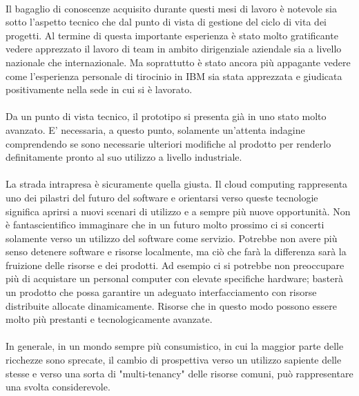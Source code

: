 \paragraph{}
Il bagaglio di conoscenze acquisito durante questi mesi di lavoro è notevole sia sotto l'aspetto tecnico che dal punto di vista di gestione del ciclo di vita dei progetti. Al termine di questa importante esperienza è stato molto gratificante vedere apprezzato il lavoro di team in ambito dirigenziale aziendale sia a livello nazionale che internazionale. Ma soprattutto è stato ancora più appagante vedere come l'esperienza personale di tirocinio in IBM sia stata apprezzata e giudicata positivamente nella sede in cui si è lavorato.

\paragraph{}
Da un punto di vista tecnico, il prototipo si presenta già in uno stato molto avanzato. E' necessaria, a questo punto, solamente un'attenta indagine comprendendo se sono necessarie ulteriori modifiche al prodotto per renderlo definitamente pronto al suo utilizzo a livello industriale.
\paragraph{}
La strada intrapresa è sicuramente quella giusta. Il cloud computing rappresenta uno dei pilastri del futuro del software e orientarsi verso queste tecnologie significa aprirsi a nuovi scenari di utilizzo e a sempre più nuove opportunità. Non è fantascientifico immaginare che in un futuro molto prossimo ci si concerti solamente verso un utilizzo del software come servizio. Potrebbe non avere più senso detenere software e risorse localmente, ma ciò che farà la differenza sarà la fruizione delle risorse e dei prodotti. Ad esempio ci si potrebbe non preoccupare più di acquistare un personal computer con elevate specifiche hardware; basterà un prodotto che possa garantire un adeguato interfacciamento con risorse distribuite allocate dinamicamente. Risorse che in questo modo possono essere molto più prestanti e tecnologicamente avanzate.
\paragraph{}
In generale, in un mondo sempre più consumistico, in cui la maggior parte delle ricchezze sono sprecate, il cambio di prospettiva verso un utilizzo sapiente delle stesse e verso una sorta di "multi-tenancy" delle risorse comuni, può rappresentare una svolta considerevole.
